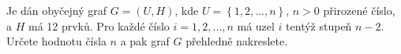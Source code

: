 \subsubsection{}
Je dán obyčejný graf $G=(U,H)$, kde $U=\left \{ 1,2,\dots,n \right \}$, $n>0$
přirozené číslo, a $H$ má 12 prvků. Pro každé číslo $i=1,2,\dots,n$ má uzel $i$
tentýž stupeň $n-2$. Určete hodnotu čísla $n$ a pak graf $G$ přehledně
nakreslete.
